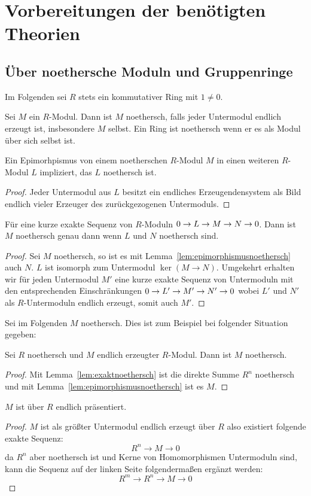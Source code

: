 
\section{Vorbereitungen der benötigten Theorien}
\label{sec:vorbereitungen}

\subsection{Über noethersche Moduln und Gruppenringe}

Im Folgenden sei $R$ stets ein kommutativer Ring mit $1\neq 0$.

Sei $M$ ein $R$-Modul. Dann ist $M$ noethersch, falls jeder Untermodul endlich erzeugt ist, insbesondere $M$ selbst. Ein Ring ist noethersch wenn er es als Modul über sich selbst ist. 
\begin{lem}
\label{lem:epimorphismusnoethersch}
	Ein Epimorhpismus von einem noetherschen $R$-Modul $M$ in einen weiteren $R$-Modul $L$ impliziert, das $L$ noethersch ist.
\end{lem}
\begin{proof}
	Jeder Untermodul aus $L$ besitzt ein endliches Erzeugendensystem als Bild endlich vieler Erzeuger des zurückgezogenen Untermoduls.
\end{proof}
\begin{lem}
\label{lem:exaktnoethersch}
	Für eine kurze exakte Sequenz von $R$-Moduln $0\to L\to M\to N\to0$. Dann ist $M$ noethersch genau dann wenn $L$ und $N$ noethersch sind.
\end{lem}
\begin{proof}
	Sei $M$ noethersch, so ist es mit Lemma~\ref{lem:epimorphismusnoethersch} auch $N$. $L$ ist isomorph zum Untermodul $\ker(M\to N)$. Umgekehrt erhalten wir für jeden Untermodul $M'$ eine kurze exakte Sequenz von Untermoduln mit den entsprechenden Einschränkungen $0\to L'\to M'\to N'\to0$ wobei $L'$ und $N'$ als $R$-Untermoduln endlich erzeugt, somit auch $M'$.
\end{proof}

Sei im Folgenden $M$ noethersch. Dies ist zum Beispiel bei folgender Situation gegeben:
\begin{cor}
	Sei $R$ noethersch und $M$ endlich erzeugter $R$-Modul. Dann ist $M$ noethersch.
\end{cor}
\begin{proof}
	Mit Lemma~\ref{lem:exaktnoethersch} ist die direkte Summe $R^n$ noethersch und mit Lemma~\ref{lem:epimorphismusnoethersch} ist es $M$.
\end{proof}
\begin{lem}
	$M$ ist über $R$ endlich präsentiert. 
\end{lem}
\begin{proof}
	$M$ ist als größter Untermodul endlich erzeugt über $R$ also existiert folgende exakte Sequenz:
	\[
		R^n \to M \to 0
	\]
	da $R^n$ aber noethersch ist und Kerne von Homomorphismen Untermoduln sind, kann die Sequenz auf der linken Seite folgendermaßen ergänzt werden:
	\[
		R^m \to R^n \to M \to 0
	\]
\end{proof}

